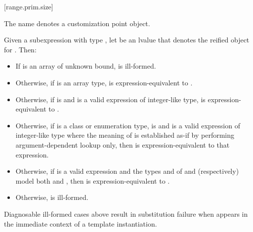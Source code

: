 [range.prim.size]{}
%

\pnum
The name  denotes a customization point
object.

\pnum
Given a subexpression  with type ,
let  be an lvalue that denotes the reified object for .
Then:

\begin{itemize}
\item
  If  is an array of unknown bound,
   is ill-formed.

\item
  Otherwise, if  is an array type,
   is expression-equivalent to
  .

\item
  Otherwise, if 
  is  and
  is a valid expression of integer-like type,
   is expression-equivalent to
  .

\item
  Otherwise, if  is a class or enumeration type,
   is  and
  is a valid expression of integer-like type
  where the meaning of  is established as-if by performing
  argument-dependent lookup only,
  then  is expression-equivalent to
  that expression.

\item
  Otherwise, if
  is a valid expression and
  the types  and  of  and
   (respectively) model both
   and
  ,
  then  is expres\-sion-equivalent to
  .

\item
  Otherwise,  is ill-formed.
\end{itemize}

\pnum
\begin{note}
Diagnosable ill-formed cases above
result in substitution failure when 
appears in the immediate context of a template instantiation.
\end{note}

